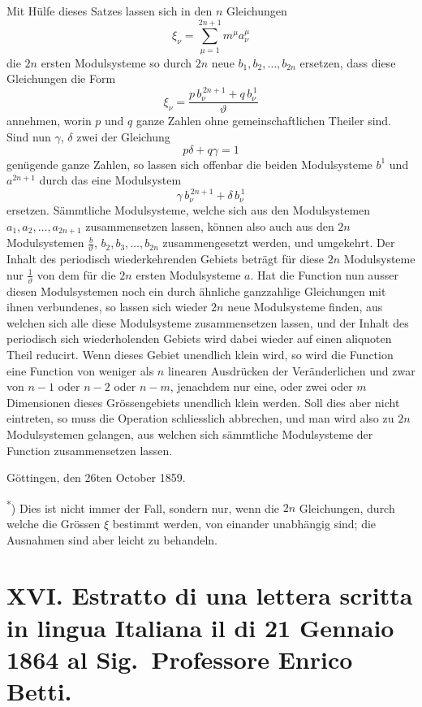 \documentclass[12pt,a4paper]{article}
\begin{document}
Mit H\"ulfe dieses Satzes lassen sich in den $n$ Gleichungen
\[\xi_{\nu} = \sum_{\mu=1}^{2n+1} m^{\mu} a^{\mu}_{\nu}\]
die $2n$ ersten Modulsysteme so durch $2n$ neue $b_{1}, b_{2}, \dots, b_{2n}$ ersetzen, dass diese Gleichungen die Form
\[\xi_{\nu} = \frac{p\, b^{\,2n+1}_{\nu} + q\, b^{\,1}_{\nu}}{\vartheta}\]
annehmen, worin $p$ und $q$ ganze Zahlen ohne gemeinschaftlichen Theiler sind. Sind nun $\gamma$, $\delta$ zwei der Gleichung
\[p\delta + q\gamma = 1\]
gen\"ugende ganze Zahlen, so lassen sich offenbar die beiden Modulsysteme $b^{1}$ und $a^{2n+1}$ durch das eine Modulsystem
\[\gamma\, b^{\,2n+1}_{\nu} + \delta\, b^{\,1}_{\nu}\]
ersetzen. S\"ammtliche Modulsysteme, welche sich aus den Modulsystemen $a_{1}, a_{2}, \dots, a_{2n+1}$ zusammensetzen lassen, k\"onnen also auch aus den $2n$ Modulsystemen $\frac{b}{\vartheta}$, $b_{2}, b_{3}, \dots, b_{2n}$ zusammengesetzt werden, und umgekehrt. Der Inhalt des periodisch wiederkehrenden Gebiets betr\"agt f\"ur diese $2n$ Modulsysteme nur $\frac{1}{\vartheta}$ von dem f\"ur die $2n$ ersten Modulsysteme $a$. Hat die Function nun ausser diesen Modulsystemen noch ein durch \"ahnliche ganzzahlige Gleichungen mit ihnen verbundenes, so lassen sich wieder $2n$ neue Modulsysteme finden, aus welchen sich alle diese Modulsysteme zusammensetzen lassen, und der Inhalt des periodisch sich wiederholenden Gebiets wird dabei wieder auf einen aliquoten Theil reducirt. Wenn dieses Gebiet unendlich klein wird, so wird die Function eine Function von weniger als $n$ linearen Ausdr\"ucken der Ver\"anderlichen und zwar von $n-1$ oder $n-2$ oder $n-m$, jenachdem nur eine, oder zwei oder $m$ Dimensionen dieses Gr\"ossengebiets unendlich klein werden. Soll dies aber nicht eintreten, so muss die Operation schliesslich abbrechen, und man wird also zu $2n$ Modulsystemen gelangen, aus welchen sich s\"ammtliche Modulsysteme der Function zusammensetzen lassen.

\bigskip
\noindent G\"ottingen, den 26ten October 1859.

\bigskip
\noindent\small\textsuperscript{*}) Dies ist nicht immer der Fall, sondern nur, wenn die $2n$ Gleichungen, durch welche die Gr\"ossen $\xi$ bestimmt werden, von einander unabh\"angig sind; die Ausnahmen sind aber leicht zu behandeln.

\newpage
\section*{XVI. Estratto di una lettera scritta in lingua Italiana il di 21 Gennaio 1864 al Sig.\ Professore Enrico Betti.}
\end{document}

